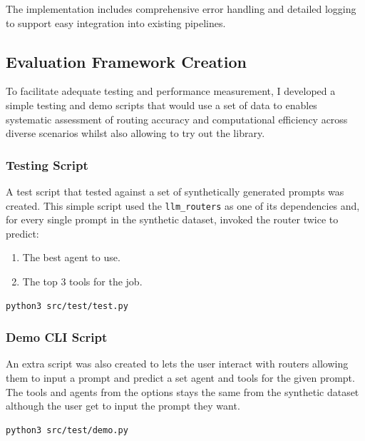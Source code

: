 The implementation includes comprehensive error handling and detailed logging to support easy integration into existing pipelines.


\subsection{Evaluation Framework Creation}
\label{evaluation framework creation}
To facilitate adequate testing and performance measurement, I developed a simple testing and demo scripts that would use a set of data to enables systematic assessment of routing accuracy and computational efficiency across diverse scenarios whilst also allowing to try out the library.


\subsubsection{Testing Script}
\label{testing script}
A test script that tested against a set of synthetically generated prompts was created. This simple script used the \texttt{llm\_routers} as one of its dependencies and, for every single prompt in the synthetic dataset, invoked the router twice to predict:

\begin{enumerate}
    \item The best agent to use.
    \item The top 3 tools for the job.
\end{enumerate}

\begin{verbatim}
python3 src/test/test.py
\end{verbatim}


\subsubsection{Demo CLI Script}
\label{demo cli script}
An extra script was also created to lets the user interact with routers allowing them to input a prompt and predict a set agent and tools for the given prompt. The tools and agents from the options stays the same from the synthetic dataset although the user get to input the prompt they want.

\begin{verbatim}
python3 src/test/demo.py
\end{verbatim}


